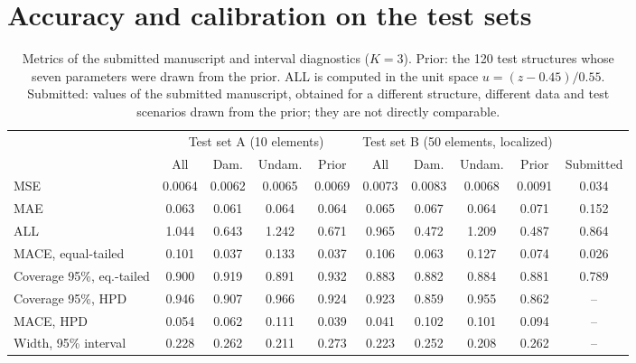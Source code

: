 \documentclass[11pt]{article}
\begin{document}
\section{Accuracy and calibration on the test sets}
\begin{table}[t]
\centering\footnotesize
\setlength{\tabcolsep}{3pt}
\caption{Metrics of the submitted manuscript and interval diagnostics ($K=3$). Prior: the 120 test structures whose
seven parameters were drawn from the prior. ALL is computed in the unit space $u=(z-0.45)/0.55$. Submitted: values
of the submitted manuscript, obtained for a different structure, different data and test scenarios drawn from the
prior; they are not directly comparable.}
\label{tab:metrics}
\begin{tabular}{l cccc cccc c}
\toprule
 & \multicolumn{4}{c}{Test set A (10 elements)} & \multicolumn{4}{c}{Test set B (50 elements, localized)} & \\
\cmidrule(lr){2-5}\cmidrule(lr){6-9}
 & All & Dam. & Undam. & Prior & All & Dam. & Undam. & Prior & Submitted \\
\midrule
MSE                      & 0.0064 & 0.0062 & 0.0065 & 0.0069 & 0.0073 & 0.0083 & 0.0068 & 0.0091 & 0.034 \\
MAE                      & 0.063  & 0.061  & 0.064  & 0.064  & 0.065  & 0.067  & 0.064  & 0.071  & 0.152 \\
ALL                      & 1.044  & 0.643  & 1.242  & 0.671  & 0.965  & 0.472  & 1.209  & 0.487  & 0.864 \\
MACE, equal-tailed       & 0.101  & 0.037  & 0.133  & 0.037  & 0.106  & 0.063  & 0.127  & 0.074  & 0.026 \\
Coverage 95\%, eq.-tailed & 0.900 & 0.919  & 0.891  & 0.932  & 0.883  & 0.882  & 0.884  & 0.881  & 0.789 \\
\addlinespace
Coverage 95\%, HPD       & 0.946  & 0.907  & 0.966  & 0.924  & 0.923  & 0.859  & 0.955  & 0.862  & -- \\
MACE, HPD                & 0.054  & 0.062  & 0.111  & 0.039  & 0.041  & 0.102  & 0.101  & 0.094  & -- \\
Width, 95\% interval     & 0.228  & 0.262  & 0.211  & 0.273  & 0.223  & 0.252  & 0.208  & 0.262  & -- \\
\bottomrule
\end{tabular}
\end{table}
\end{document}
